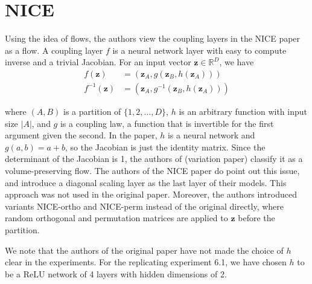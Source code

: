 \section*{NICE}

Using the idea of flows, the authors view the coupling layers in the NICE paper as a flow. A coupling layer $f$ is a neural network layer with easy to compute inverse and a trivial Jacobian. For an input vector $\mathbf{z} \in \mathbb{R}^D$, we have
\begin{align*}
    f(\mathbf{z}) &= (\mathbf{z}_A, g(\mathbf{z}_B,h(\mathbf{z}_A)))\\
    f^{-1}(\mathbf{z}) &= (\mathbf{z}_A, g^{-1}(\mathbf{z}_B,h(\mathbf{z}_A)))
\end{align*}

where $(A,B)$ is a partition of $\{1,2,\dots,D\}$, $h$ is an arbitrary function with input size $|A|$, and $g$ is a coupling law, a function that is invertible for the first argument given the second. In the paper, $h$ is a neural network and $g(a,b)=a+b$, so the Jacobian is just the identity matrix. Since the determinant of the Jacobian is 1, the authors of (variation paper) classify it as a volume-preserving flow.
The authors of the NICE paper do point out this issue, and introduce a diagonal scaling layer as the last layer of their models. This approach was not used in the original paper. Moreover, the authors introduced variants NICE-ortho and NICE-perm instead of the original directly, where random orthogonal and permutation matrices are applied to $\mathbf{z}$ before the partition. 

We note that the authors of the original paper have not made the choice of $h$ clear in the experiments. For the replicating experiment 6.1, we have chosen $h$ to be a ReLU network of 4 layers with hidden dimensions of 2.